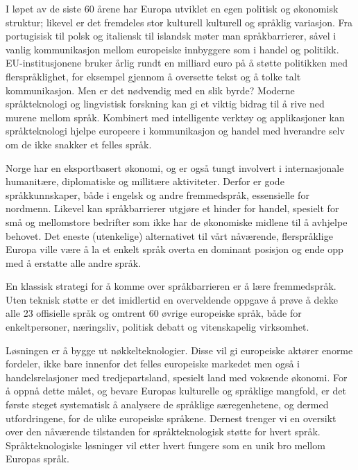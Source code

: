 
\begin{multicols}{2}

I løpet av de siste 60 årene har Europa utviklet en egen politisk og økonomisk struktur; likevel er det fremdeles stor kulturell kulturell og språklig variasjon. Fra portugisisk til polsk og italiensk til islandsk møter man språkbarrierer, såvel i vanlig kommunikasjon mellom europeiske innbyggere som i handel og politikk. EU-institusjonene bruker årlig rundt en milliard euro på å støtte politikken med flerspråklighet, for eksempel gjennom å oversette tekst og å tolke talt kommunikasjon. Men er det nødvendig med en slik byrde? Moderne språkteknologi og lingvistisk forskning kan gi et viktig bidrag til å rive ned murene mellom språk. Kombinert med intelligente verktøy og applikasjoner kan språkteknologi hjelpe europeere i kommunikasjon og handel med hverandre selv om de ikke snakker et felles språk.


Norge har en eksportbasert økonomi, og er også tungt involvert i internasjonale humanitære, diplomatiske og millitære aktiviteter. Derfor er gode språkkunnskaper, både i engelsk og andre fremmedspråk, essensielle for nordmenn. 
Likevel kan språkbarrierer utgjøre et hinder for handel, spesielt for små og mellomstore bedrifter som ikke har de økonomiske midlene til å avhjelpe behovet. Det eneste (utenkelige) alternativet til vårt nåværende, flerspråklige Europa ville være å la et enkelt språk overta en dominant posisjon og ende opp med å erstatte alle andre språk.

En klassisk strategi for å komme over språkbarrieren er å lære fremmedspråk. Uten teknisk støtte er det imidlertid en overveldende oppgave å prøve å dekke alle 23 offisielle språk og omtrent 60 øvrige europeiske språk, både for enkeltpersoner, næringsliv, politisk debatt og vitenskapelig virksomhet.

Løsningen er å bygge ut nøkkelteknologier. Disse vil gi europeiske aktører enorme fordeler, ikke bare innenfor det felles europeiske markedet men også i handelsrelasjoner med tredjepartsland, spesielt land med voksende økonomi. For å oppnå dette målet, og bevare Europas kulturelle og språklige mangfold, er det første steget systematisk å analysere de språklige særegenhetene, og dermed utfordringene, for de ulike europeiske språkene. Dernest trenger vi en oversikt over den nåværende tilstanden for språkteknologisk støtte for hvert språk. Språkteknologiske løsninger vil etter hvert fungere som en unik bro mellom Europas språk.
    

\end{multicols}
